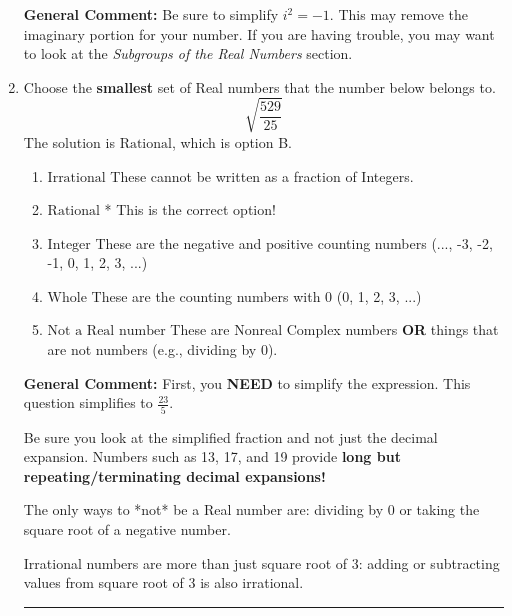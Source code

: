 \documentclass{extbook}[14pt]
\newcommand{\litem}[1]{\item #1

\rule{\textwidth}{0.4pt}}
\begin{document}
\begin{enumerate}
{\textbf{General Comment:} Be sure to simplify $i^2 = -1$. This may remove the imaginary portion for your number. If you are having trouble, you may want to look at the \textit{Subgroups of the Real Numbers} section.
}
\litem{
Choose the \textbf{smallest} set of Real numbers that the number below belongs to.
\[ \sqrt{\frac{529}{25}} \]
The solution is \( \text{Rational} \), which is option B.\begin{enumerate}[label=\Alph*.]
\item \( \text{Irrational} \)
These cannot be written as a fraction of Integers.
\item \( \text{Rational} \)
* This is the correct option!
\item \( \text{Integer} \)
These are the negative and positive counting numbers (..., -3, -2, -1, 0, 1, 2, 3, ...)
\item \( \text{Whole} \)
These are the counting numbers with 0 (0, 1, 2, 3, ...)
\item \( \text{Not a Real number} \)
These are Nonreal Complex numbers \textbf{OR} things that are not numbers (e.g., dividing by 0).
\end{enumerate}

\textbf{General Comment:} First, you \textbf{NEED} to simplify the expression. This question simplifies to $\frac{23}{5}$. 
 
 Be sure you look at the simplified fraction and not just the decimal expansion. Numbers such as 13, 17, and 19 provide \textbf{long but repeating/terminating decimal expansions!} 
 
 The only ways to *not* be a Real number are: dividing by 0 or taking the square root of a negative number. 
 
 Irrational numbers are more than just square root of 3: adding or subtracting values from square root of 3 is also irrational.
}


\end{enumerate}
\end{document}
